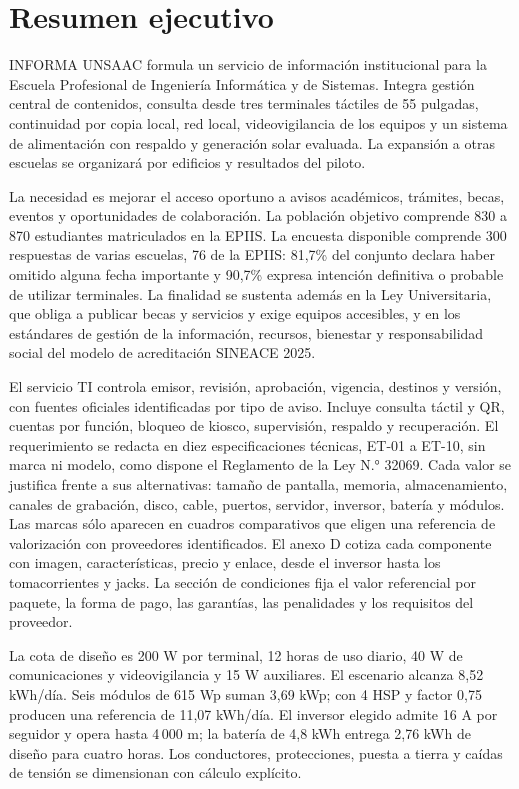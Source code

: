 \section*{Resumen ejecutivo}
INFORMA UNSAAC formula un servicio de información institucional para la Escuela Profesional de Ingeniería Informática y de Sistemas. Integra gestión central de contenidos, consulta desde tres terminales táctiles de 55 pulgadas, continuidad por copia local, red local, videovigilancia de los equipos y un sistema de alimentación con respaldo y generación solar evaluada. La expansión a otras escuelas se organizará por edificios y resultados del piloto.

La necesidad es mejorar el acceso oportuno a avisos académicos, trámites, becas, eventos y oportunidades de colaboración. La población objetivo comprende 830 a 870 estudiantes matriculados en la EPIIS. La encuesta disponible comprende 300 respuestas de varias escuelas, 76 de la EPIIS: 81,7\% del conjunto declara haber omitido alguna fecha importante y 90,7\% expresa intención definitiva o probable de utilizar terminales. La finalidad se sustenta además en la Ley Universitaria, que obliga a publicar becas y servicios y exige equipos accesibles, y en los estándares de gestión de la información, recursos, bienestar y responsabilidad social del modelo de acreditación SINEACE 2025.

El servicio TI controla emisor, revisión, aprobación, vigencia, destinos y versión, con fuentes oficiales identificadas por tipo de aviso. Incluye consulta táctil y QR, cuentas por función, bloqueo de kiosco, supervisión, respaldo y recuperación. El requerimiento se redacta en diez especificaciones técnicas, ET-01 a ET-10, sin marca ni modelo, como dispone el Reglamento de la Ley N.° 32069. Cada valor se justifica frente a sus alternativas: tamaño de pantalla, memoria, almacenamiento, canales de grabación, disco, cable, puertos, servidor, inversor, batería y módulos. Las marcas sólo aparecen en cuadros comparativos que eligen una referencia de valorización con proveedores identificados. El anexo D cotiza cada componente con imagen, características, precio y enlace, desde el inversor hasta los tomacorrientes y jacks. La sección de condiciones fija el valor referencial por paquete, la forma de pago, las garantías, las penalidades y los requisitos del proveedor.

La cota de diseño es 200 W por terminal, 12 horas de uso diario, 40 W de comunicaciones y videovigilancia y 15 W auxiliares. El escenario alcanza 8,52 kWh/día. Seis módulos de 615 Wp suman 3,69 kWp; con 4 HSP y factor 0,75 producen una referencia de 11,07 kWh/día. El inversor elegido admite 16 A por seguidor y opera hasta 4\,000 m; la batería de 4,8 kWh entrega 2,76 kWh de diseño para cuatro horas. Los conductores, protecciones, puesta a tierra y caídas de tensión se dimensionan con cálculo explícito.

